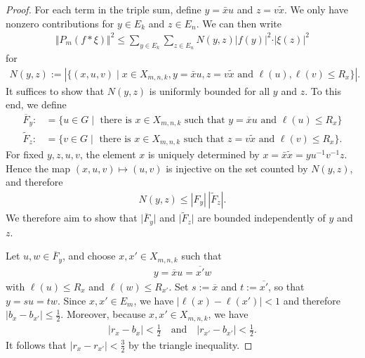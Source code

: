 \documentclass[12pt,a4paper,oneside,final,reqno]{amsart}
\theoremstyle{plain}
\theoremstyle{definition}
\begin{document}
\begin{proof}
    For each term in the triple sum, define $y = \bar{x}u$ and $z = v\tilde{x}$. We only have nonzero contributions for $y \in E_k$ and $z \in E_n$. 
    We can then write
    \begin{align}\label{eq:multiplicity-convolution-bound-Nyz}
        \Vert P_m (f*\xi) \Vert^2 \leq  \sum_{y \in E_k} \sum_{z \in E_n} N(y,z) \vert f(y) \vert^2 \cdot \vert \xi(z) \vert^2
    \end{align}
    for
    \begin{align*}
        N(y,z) := |\{(x,u,v) \mid x \in X_{m,n,k}, y = \bar{x}u, z= v\tilde{x}\text{ and } \ell(u),\ell(v) \leq R_x \}|.
    \end{align*}
    It suffices to show that $N(y,z)$ is uniformly bounded for all $y$ and $z$. To this end, we define
    \begin{align*}
        \overline{F}_y :&= \{ u \in G \mid  \text{  there is $x \in X_{m,n,k}$ such that $y = \overline{x}u$} \text{ and } \ell(u) \leq R_x \} \\
        \tilde{F}_z :&=  \{ v \in G \mid  \text{  there is $x \in X_{m,n,k}$ such that $z = v\tilde{x}$ and $\ell(v) \leq R_x$} \}.
    \end{align*}
    For fixed $y,z,u,v$, the element $x$ is uniquely determined by $x=\bar x\widetilde x
=yu^{-1}v^{-1}z$.
Hence the map
$(x,u,v)\mapsto (u,v)$ 
is injective on the set counted by $N(y,z)$, and therefore
\begin{align*}
    N(y,z)\leq |F_y|\,|\widetilde F_z|.
\end{align*}  
    We therefore aim to show that $\vert \overline{F}_y \vert $ and $\vert \tilde{F}_z \vert$ are bounded independently of $y$ and $z$. 


    Let $u,w \in \overline{F}_y$, and choose $x,x' \in X_{m,n,k}$ such that
    \begin{align*}
        y = \overline{x}u = \overline{x'}w
    \end{align*}
    with $\ell(u) \leq R_x$ and $\ell(w) \leq R_{x'}$. Set $s:= \overline{x}$ and $t:= \overline{x'}$, so that $y = su = tw$. Since $x,x' \in E_m$, we have
    $\vert \ell(x) - \ell(x') \vert < 1$ and therefore $\vert b_x - b_{x'} \vert \leq \frac{1}{2}$. Moreover, because $x,x' \in X_{m,n,k}$, we have
    \begin{align*}
        \vert r_x - b_x \vert < \frac{1}{2} \quad \text{and} \quad \vert r_{x'} - b_{x'} \vert < \frac{1}{2}.
    \end{align*}
    It follows that $\vert r_x - r_{x'}\vert < \frac{3}{2}$ by the triangle inequality. 
    

\end{proof}
\end{document}
